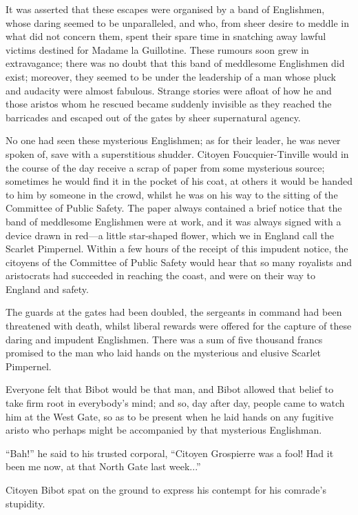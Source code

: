 \documentclass[paper=5.5in:8.5in,BCOR=7mm,twoside,DIV=calc,12pt,usegeometry,chapterprefix,endperiod,headings=big]{scrbook}
\begin{document}
It was asserted that these escapes were organised by a band of Englishmen, whose daring seemed to be unparalleled, and who, from sheer desire to meddle in what did not concern them, spent their spare time in snatching away lawful victims destined for Madame la Guillotine. These rumours soon grew in extravagance; there was no doubt that this band of meddlesome Englishmen did exist; moreover, they seemed to be under the leadership of a man whose pluck and audacity were almost fabulous. Strange stories were afloat of how he and those aristos whom he rescued became suddenly invisible as they reached the barricades and escaped out of the gates by sheer supernatural agency.

No one had seen these mysterious Englishmen; as for their leader, he was never spoken of, save with a superstitious shudder. Citoyen Foucquier-Tinville would in the course of the day receive a scrap of paper from some mysterious source; sometimes he would find it in the pocket of his coat, at others it would be handed to him by someone in the crowd, whilst he was on his way to the sitting of the Committee of Public Safety. The paper always contained a brief notice that the band of meddlesome Englishmen were at work, and it was always signed with a device drawn in red---a little star-shaped flower, which we in England call the Scarlet Pimpernel. Within a few hours of the receipt of this impudent notice, the citoyens of the Committee of Public Safety would hear that so many royalists and aristocrats had succeeded in reaching the coast, and were on their way to England and safety.

The guards at the gates had been doubled, the sergeants in command had been threatened with death, whilst liberal rewards were offered for the capture of these daring and impudent Englishmen. There was a sum of five thousand francs promised to the man who laid hands on the mysterious and elusive Scarlet Pimpernel.

Everyone felt that Bibot would be that man, and Bibot allowed that belief to take firm root in everybody's mind; and so, day after day, people came to watch him at the West Gate, so as to be present when he laid hands on any fugitive aristo who perhaps might be accompanied by that mysterious Englishman.

\enquote{Bah!} he said to his trusted corporal, \enquote{Citoyen Grospierre was a fool! Had it been me now, at that North Gate last week...}

Citoyen Bibot spat on the ground to express his contempt for his comrade's stupidity.
\end{document}
